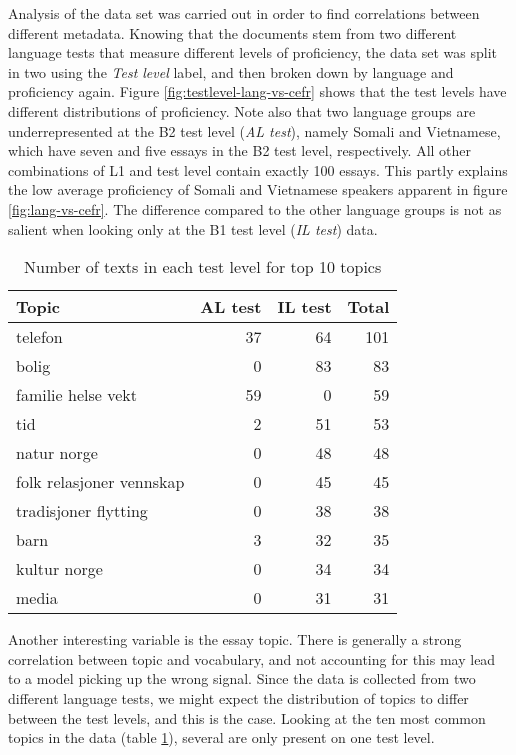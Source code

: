 Analysis of the data set was carried out in order to find correlations
between different metadata. Knowing that the documents stem from two
different language tests that measure different levels of proficiency, the
data set was split in two using the \emph{Test level} label, and then broken
down by language and proficiency again. Figure \ref{fig:testlevel-lang-vs-cefr}
shows that the test levels have different distributions of proficiency. Note
also that two language groups are underrepresented at the B2 test level
(\emph{AL test}), namely Somali and Vietnamese, which have seven and five
essays in the B2 test level, respectively. All other combinations of L1 and
test level contain exactly 100 essays. This partly explains the low average
proficiency of Somali and Vietnamese speakers apparent in figure
\ref{fig:lang-vs-cefr}. The difference compared to the other language groups is
not as salient when looking only at the B1 test level (\emph{IL test}) data.

\begin{table}
  \centering
  \begin{tabular}{lrrr}
    \toprule
    Topic                    & AL test & IL test & Total \\
    \midrule
    telefon                  &      37 &      64 &   101 \\
    bolig                    &       0 &      83 &    83 \\
    familie helse vekt       &      59 &       0 &    59 \\
    tid                      &       2 &      51 &    53 \\
    natur norge              &       0 &      48 &    48 \\
    folk relasjoner vennskap &       0 &      45 &    45 \\
    tradisjoner flytting     &       0 &      38 &    38 \\
    barn                     &       3 &      32 &    35 \\
    kultur norge             &       0 &      34 &    34 \\
    media                    &       0 &      31 &    31 \\
    \bottomrule
  \end{tabular}
  \caption{Number of texts in each test level for top 10 topics}
  \label{tab:texts-per-topic}
\end{table}

Another interesting variable is the essay topic. There is generally a strong
correlation between topic and vocabulary, and not accounting for this may
lead to a model picking up the wrong signal. Since the data is collected from
two different language tests, we might expect the distribution of topics to
differ between the test levels, and this is the case. Looking at the ten most
common topics in the data (table \ref{tab:texts-per-topic}), several are only
present on one test level.

